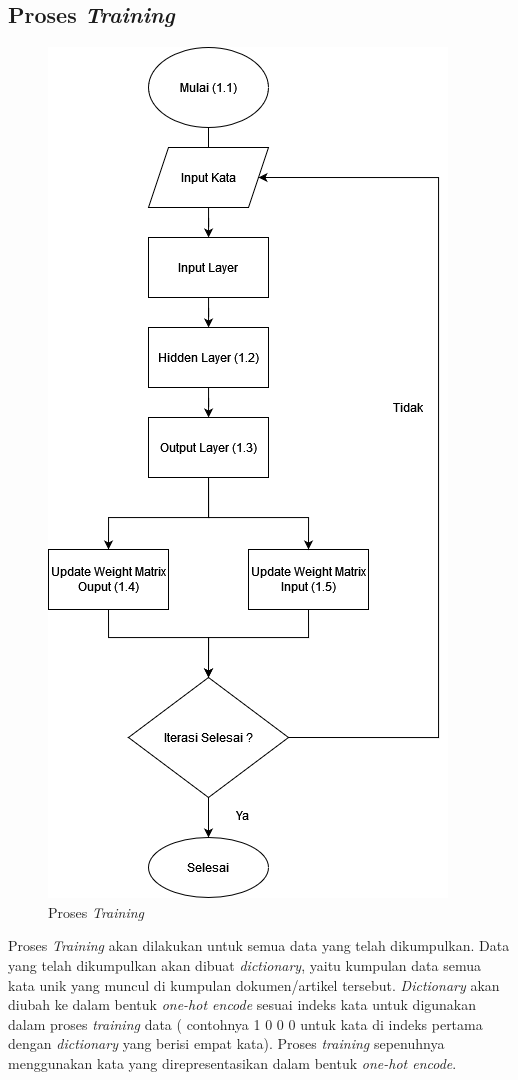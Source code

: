 \documentclass[12pt]{report}
\begin{document}
\subsection{Proses \textit{Training}}
\begin{figure}[H]
\centering
\includegraphics[scale=0.60]{prosestrainingrev4}
\caption{Proses \textit{Training}}
\label{prosestraining}
\end{figure}

	Proses \textit{Training} akan dilakukan untuk semua data yang telah dikumpulkan. Data yang telah dikumpulkan akan dibuat \textit{dictionary}, yaitu kumpulan data semua kata unik yang muncul di kumpulan dokumen/artikel tersebut. \textit{Dictionary} akan diubah ke dalam bentuk \textit{one-hot encode} sesuai indeks kata untuk digunakan dalam proses \textit{training} data ( contohnya {1 0 0 0} untuk kata di indeks pertama dengan \textit{dictionary} yang berisi empat kata). Proses \textit{training} sepenuhnya menggunakan kata yang direpresentasikan dalam bentuk \textit{one-hot encode}.
\end{document}
